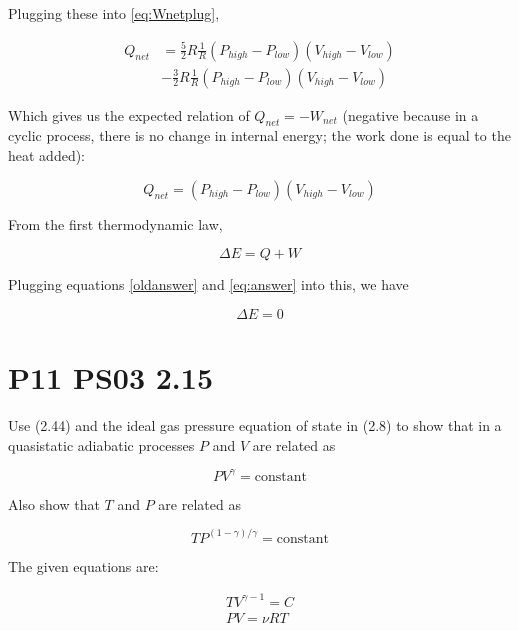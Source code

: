 \documentclass[9pt,a4paper,twocolumn]{article}
\begin{document}
Plugging these into \eqref{eq:Wnetplug},

\begin{align}
	Q_{net} & = \frac{5}{2} R \frac{1}{R} \left( P_{high} - P_{low} \right) \left( V_{high} - V_{low} \right) \nonumber \\
	& -\frac{3}{2} R \frac{1}{R} \left( P_{high} - P_{low} \right) \left( V_{high} - V_{low} \right) \label{eq:Wnetideal}
\end{align}

Which gives us the expected relation of $Q_{net} = -W_{net}$ (negative because in a cyclic process, there is no change in internal energy; the work done is equal to the heat added):

\begin{equation}\label{eq:answer}
	Q_{net} = \left( P_{high} - P_{low} \right) \left( V_{high} - V_{low} \right)
\end{equation}

From the first thermodynamic law,

\begin{equation}\label{eq:1stlaw}
	\Delta E = Q + W
\end{equation}

Plugging equations \eqref{oldanswer} and \eqref{eq:answer} into this, we have

\begin{equation}\label{eq:energychange}
	\Delta E = 0
\end{equation}

\section{P11 PS03 2.15}
Use (2.44) and the ideal gas pressure equation of state in (2.8) to show that in a quasistatic adiabatic processes $P$ and $V$ are related as

\begin{equation}
	PV^\gamma = \textrm{constant}
\end{equation}

Also show that $T$ and $P$ are related as

\begin{equation}
	TP^{(1-\gamma)/\gamma} = \textrm{constant}
\end{equation}

The given equations are:

\begin{eqnarray}
	TV^{\gamma-1} = C \label{eq:given1} \\
	PV = \nu RT \label{eq:idealgaslaw}
\end{eqnarray}
\end{document}
